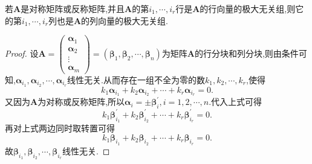 \documentclass[../../main.tex]{subfiles}%
\begin{document}
\begin{proposition}\label{proposition:对称矩阵或反称矩阵的极大无关组}
若\(\boldsymbol{A}\)是对称矩阵或反称矩阵,并且\(\boldsymbol{A}\)的第\(i_1,\cdots,i_r\)行是\(\boldsymbol{A}\)的行向量的极大无关组,则它的第\(i_1,\cdots,i_r\)列也是\(\boldsymbol{A}\)的列向量的极大无关组.
\end{proposition}
\begin{proof}
设\(\boldsymbol{A}=\begin{pmatrix}
\boldsymbol{\alpha}_1 \\
\boldsymbol{\alpha}_2 \\
\vdots \\
\boldsymbol{\alpha}_m
\end{pmatrix}=(\boldsymbol{\beta}_1,\boldsymbol{\beta}_2,\cdots,\boldsymbol{\beta}_n)\)为矩阵\(\boldsymbol{A}\)的行分块和列分块,则由条件可知,\(\boldsymbol{\alpha}_{i_1},\boldsymbol{\alpha}_{i_2},\cdots,\boldsymbol{\alpha}_{i_r}\)线性无关.从而存在一组不全为零的数\(k_1,k_2,\cdots,k_r\),使得
\[k_1\boldsymbol{\alpha}_{i_1}+k_2\boldsymbol{\alpha}_{i_2}+\cdots +k_r\boldsymbol{\alpha}_{i_r}=0.\]
又因为\(\boldsymbol{A}\)为对称或反称矩阵,所以\(\boldsymbol{\alpha}_i = \pm\boldsymbol{\beta}_{i}^{\prime}, i = 1,2,\cdots,n\).代入上式可得
\[k_1\boldsymbol{\beta}_{i_1}^{\prime}+k_2\boldsymbol{\beta}_{i_2}^{\prime}+\cdots +k_r\boldsymbol{\beta}_{i_r}^{\prime}=0.\]
再对上式两边同时取转置可得
\[k_1\boldsymbol{\beta}_{i_1}+k_2\boldsymbol{\beta}_{i_2}+\cdots +k_r\boldsymbol{\beta}_{i_r}=0.\]
故\(\boldsymbol{\beta}_{i_1},\boldsymbol{\beta}_{i_2},\cdots,\boldsymbol{\beta}_{i_r}\)线性无关.
\end{proof}
\end{document}
